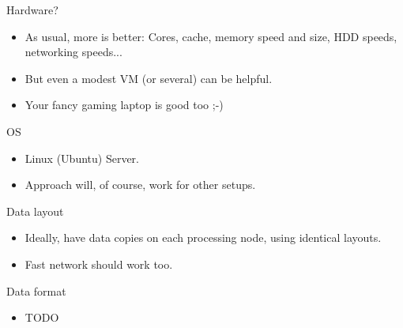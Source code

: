 \documentclass[handout]{beamer}
\begin{document}

\begin{frame}{Hardware?}

\begin{itemize}
\item As usual, more is better: Cores, cache, memory speed and size,
      HDD speeds, networking speeds...
\item But even a modest VM (or several) can be helpful.
\item Your fancy gaming laptop is good too ;-)
\end{itemize}

\end{frame}


\begin{frame}{OS}

\begin{itemize}
\item Linux (Ubuntu) Server.
\item Approach will, of course, work for other setups.
\end{itemize}

\end{frame}


\begin{frame}{Data layout}

\begin{itemize}
\item Ideally, have data copies on each processing node, using identical
      layouts.
\item Fast network should work too.
\end{itemize}

\end{frame}


\begin{frame}{Data format}

\begin{itemize}
\item TODO
\end{itemize}

\end{frame}
\end{document}
